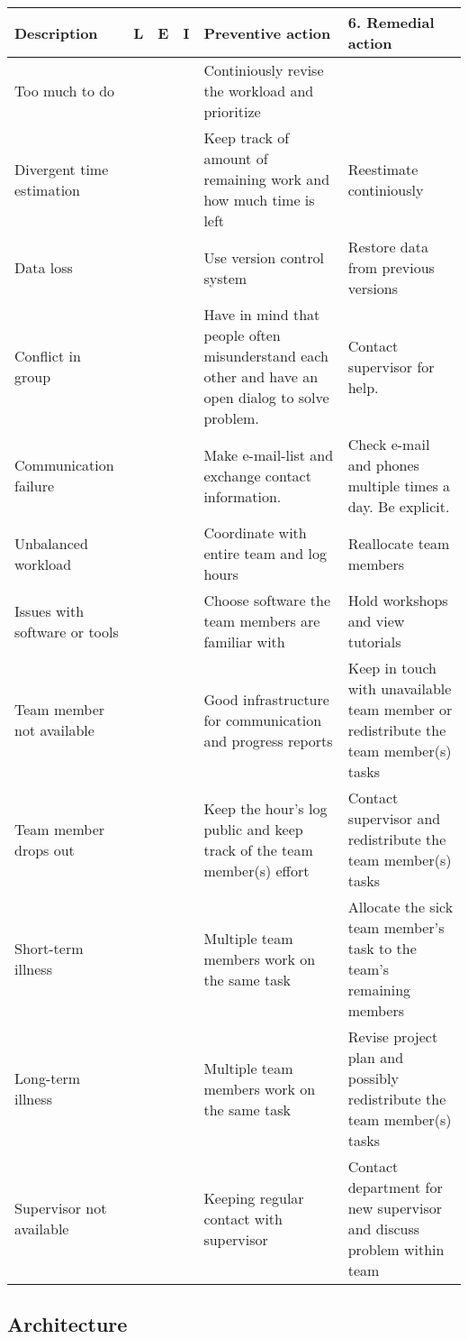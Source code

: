 \begin{table}[H]
\begin{tabular}{|p{4cm}|l|l|l|p{4.5cm}|p{4.5cm}|}
\hline
Description &L& E& I& Preventive action & 6. Remedial action \\\hline
Too much to do&&&& Continiously revise the workload and prioritize &  \\\hline
Divergent time estimation & &&& Keep track of amount of remaining work and how much time is left & Reestimate continiously\\\hline
Data loss&&&& Use version control system &Restore data from previous versions\\\hline
Conflict in group& & & & Have in mind that people often misunderstand each other and have an open dialog to solve problem. & Contact supervisor for help.\\\hline
Communication failure &&&& Make e-mail-list and exchange contact information. & Check e-mail and phones multiple times a day. Be explicit.\\\hline
Unbalanced workload&&&& Coordinate with entire team and log hours & Reallocate team members\\\hline
Issues with software or tools&&&& Choose software the team members are familiar with & Hold workshops and view tutorials\\\hline
Team member not available &&&& Good infrastructure for communication and progress reports & Keep in touch with unavailable team member or redistribute the team member(s) tasks\\\hline
Team member drops out &&&& Keep the hour's log public and keep track of the team member(s) effort & Contact supervisor and redistribute the team member(s) tasks \\\hline
Short-term illness &&&&Multiple team members work on the same task& Allocate the sick team member's task to the team's remaining members\\\hline
Long-term illness&&&&Multiple team members work on the same task & Revise project plan and possibly redistribute the team member(s) tasks \\\hline
Supervisor not available&&&& Keeping regular contact with supervisor & Contact department for new supervisor and discuss problem within team\\\hline
\end{tabular}
\end{table}


\subsection{Architecture}
